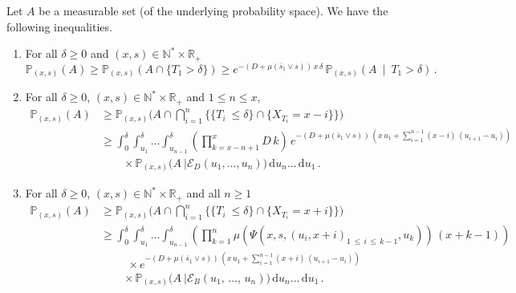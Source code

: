 \documentclass[AHL,Unicode,longabstracts,published]{cedram}
\newcommand{\PP}{\mathbb{P}}
\newcommand{\RR}{\mathbb{R}}
\newcommand{\NN}{\mathbb{N}}
\newcommand{\clE}{\mathcal{E}}
\newcommand{\dif}{\mathrm{d}}
\newcommand{\1}{\mathbf{1}}
\begin{document}
\begin{lemm}\label{prop.minore.proba.evt}
Let $A$ be a measurable set (of the underlying probability space). We have the following inequalities.
\begin{enumerate}
\item\label{lemmA.9.1} For all $\delta \geq 0$ and $(x,s) \in \NN^*\times \RR_+$
\[
\PP_{(x,s)}(A)\geq \PP_{(x,s)}(A \cap \{T_1 > \delta\}) \geq e^{-(D+\mu(\bar s_1 \vee s))\,x\,\delta}\,\PP_{(x,s)}\left(A \ \middle| \ T_1 > \delta\right)\,.
\]
\item\label{lemmA.9.2} For all $\delta \geq 0$, $(x,s) \in \NN^*\times \RR_+$ and $1\leq n\leq x$,
\begin{align*}
\PP_{(x,s)}(A) & \geq
\PP_{(x,s)}
\Big(A \cap
\bigcap_{i=1}^{n}\Big\{\{T_i\ \leq\delta\} \cap \{ X_{T_i} = x-i \}\Big\}\Big)
\\
&\geq \int_0^{\delta} \int_{u_1}^{\delta}\dots \int_{u_{n-1}}^{\delta}
\left(\prod_{k=x-n+1}^{x}D\,k\right)\, e^{-(D+\mu(\bar s_1 \vee s))\,\left(x\,u_1+
\sum\limits_{i=1}^{n-1}(x-i)\,(u_{i+1}-u_{i})\right)}\,
\\
& \qquad \times
\PP_{(x,s)}
\Big(A \ \Big| \clE_D(u_1,\dots,u_n) \Big)\,
\dif u_{n}\dots\,\dif u_1\,.
\end{align*}

\item\label{lemmA.9.3} For all $\delta \geq 0$, $(x,s) \in \NN^*\times \RR_+$ and all $n\geq 1$
\begin{align*}
\PP_{(x,s)}(A) &
\geq \PP_{(x,s)}
\Big(A \cap
\bigcap_{i=1}^{n}\Big\{\{T_i\ \leq\delta\} \cap \{ X_{T_i} = x+i \}\Big\}\Big)
\\
&\geq \int_0^{\delta} \int_{u_1}^{\delta}\dots \int_{u_{n-1}}^{\delta}
\left(\prod_{k=1}^{n}\mu\left(\Psi(x,s,(u_i,x+i)_{1\,\leq\,i\,\leq\,k-1},u_k)\right)\,(x+k-1)\right)\,
\\
& \hspace{1cm} \times e^{-(D+\mu(\bar s_1 \vee s))\,\left(x\,u_1+
\sum\limits_{i=1}^{n-1}(x+i)\,\left(u_{i+1}-u_{i}\right)\right)}\,
\\
& \qquad \times
\PP_{(x,s)}
\Big(A \ \Big| \clE_B(u_1,\,\dots,\,u_n) \Big)\,
\dif u_{n}\dots\,\dif u_1\,.
\end{align*}
\end{enumerate}
\end{lemm}
\end{document}
